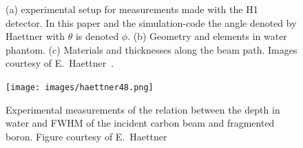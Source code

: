 \begin{figure}[!ht]
\centering
{}
\label{fig:EHaettnerDataForAEDistrib1}
\caption[Optional caption for list of figures]{(a) experimental setup for measurements made with the H1 detector. In this paper and the simulation-code the angle denoted by Haettner with $\theta$ is denoted $\phi$. (b) Geometry and elements in water phantom. (c) Materials and thicknesses along the beam path. Images courtesy of E.~Haettner~\cite{ehaettner}.}
\label{fig:ShouldGiveTableAndFigure}
\end{figure}

\begin{figure}[h] 
\begin{center}
\texttt{[image: images/haettner48.png]}  
\caption{\label{fig:haettner48} Experimental measurements of the relation between the depth in water and FWHM of the incident carbon beam and fragmented boron. Figure courtesy of E.~Haettner~\cite{ehaettner}}
 \end{center}
 \end{figure}


